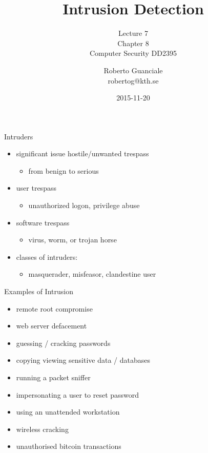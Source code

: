 \documentclass{beamer}
\title{Intrusion Detection}
\subtitle{Lecture 7 \\ Chapter 8\\Computer Security DD2395}
\author[R. Guanciale]{
  Roberto Guanciale\\
  robertog@kth.se
}
\date{2015-11-20}
\begin{document}
\begin{frame}[plain]
  \titlepage
\end{frame}


\begin{frame}{Intruders}
  \begin{itemize}
  \item significant issue hostile/unwanted trespass 
    \begin{itemize}
    \item from benign to serious 
    \end{itemize}
  \item user trespass 
    \begin{itemize}
    \item unauthorized logon, privilege abuse 
    \end{itemize}
  \item software trespass 
      \begin{itemize}
      \item virus, worm, or trojan horse 
    \end{itemize}
  \item classes of intruders: 
      \begin{itemize}
      \item masquerader, misfeasor, clandestine user
    \end{itemize}
  \end{itemize}
\end{frame}

\begin{frame}{Examples of Intrusion}
  \begin{itemize}
  \item remote root compromise 
  \item web server defacement 
  \item guessing / cracking passwords 
  \item copying viewing sensitive data / databases 
  \item running a packet sniffer 
  \item impersonating a user to reset password 
  \item using an unattended workstation 
  \item wireless cracking
  \item unauthorised bitcoin transactions
  \end{itemize}
\end{frame}
\end{document}
